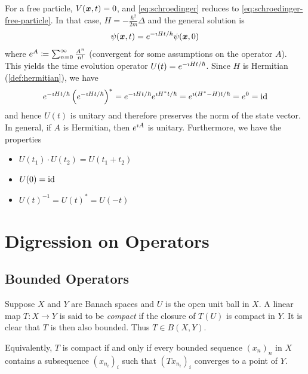 For a free particle, 
$V({\boldsymbol{x}}, t) = 0$, and \eqref{eq:schroedinger} reduces to \eqref{eq:schroedinger-free-particle}.
In that case, 
$H = -\tfrac{\hbar^2}{2m}\Delta$ 
and 
the general solution is
\[
  \psi({\boldsymbol{x}}, t) = e^{- \imath H t / \hbar} \psi({\boldsymbol{x}}, 0)
\]
where $e^{A} \coloneq \sum_{n=0}^\infty \frac{A^n}{n!}$ (convergent for some assumptions on the operator $A$).
This yields the time evolution operator $U(t) = e^{- \imath H t / \hbar}$.
Since $H$ is Hermitian (\autoref{def:hermitian}), we have
\[
e^{- \imath H t / \hbar} \left(e^{- \imath H t / \hbar}\right)^*
=
e^{- \imath H t / \hbar} e^{\imath H^* t / \hbar}
=
e^{\imath (H^* - H) t / \hbar}
=
e^{0}
=
\operatorname{id}
\]
and hence $U(t)$ is unitary and therefore preserves the norm of the state vector.
In general, if $A$ is Hermitian, then $e^{\imath A}$ is unitary.
Furthermore, we have the properties
\begin{itemize}
  \item $U(t_1) \cdot U(t_2) = U(t_1 + t_2)$
  \item $U(0) = \operatorname{id}$
  \item $U(t)^{-1} = U(t)^* = U(-t)$
\end{itemize}










\clearpage

\section{Digression on Operators}\label{sec:operators}


\subsection{Bounded Operators}

\begin{definition}\label{def:compact-operator}
Suppose $X$ and $Y$ are Banach spaces and $U$ is the open unit ball in $X$.
A linear map $T \colon X \to Y$ is said to be \emph{compact} if the closure of $T(U)$ is compact in $Y$.
It is clear that $T$ is then also bounded.
Thus $T \in B(X,Y)$.
\end{definition}
Equivalently, $T$ is compact if and only if every bounded sequence $(x_n)_n$ in $X$ contains a subsequence $(x_{n_i})_i$ such that $(Tx_{n_i})_i$ converges to a point of $Y$.

